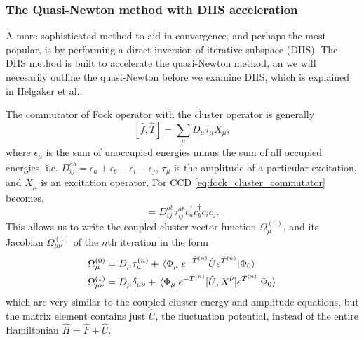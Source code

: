     


    \subsubsection{The Quasi-Newton method with DIIS acceleration}

    A more sophisticated method to aid in convergence, and perhaps the most popular,
    is by performing a direct inversion of iterative subspace (DIIS). The DIIS method 
    is built to accelerate the quasi-Newton method, an we will necesarily outline the 
    quasi-Newton before we examine DIIS, which is explained in Helgaker et 
    al.\cite{helgaker2014molecular}.

    The commutator of Fock operator with the cluster operator is generally
    \begin{equation}
        \label{eq:fock_cluster_commutator}
        [\hat{f}, \hat{T}] = \sum_\mu D_\mu \tau_\mu X_\mu,
    \end{equation}
    where $\epsilon_\mu$ is the sum of unoccupied energies minus the sum of all 
    occupied energies, i.e. $D^{ab}_{ij} = \epsilon_a  + \epsilon_b - \epsilon_i - \epsilon_j$,
    $\tau_\mu$ is the amplitude of a particular excitation, and $X_\mu$ is an excitation 
    operator. For CCD \autoref{eq:fock_cluster_commutator} becomes,
    \begin{equation}
        [\hat{f}, \hat{T}_2] = D^{ab}_{ij} \tau^{ab}_{ij} c^\dagger_a c^\dagger_b c_i c_j.
    \end{equation}
    This allows us to write the coupled cluster vector function $\Omega^{(0)}_\mu$,
    and its Jacobian $\Omega^{(1)}_{\mu\nu}$ of the $n$th iteration in the form 
    \begin{align}
        \label{eq:vector_function_diis}
        \Omega^{(0)}_\mu &= D_\mu \tau^{(n)}_\mu 
            + \mel{\Phi_\mu}
            {e^{-\hat{T}^{(n)}} \hat{U} e^{\hat{T}^{(n)}}}
            {\Phi_0} \\
        \label{eq:jacobian_diis}
        \Omega^{(1)}_{\mu\nu} &= D_\mu\delta_{\mu\nu} 
            + \mel{\Phi_\mu}
            {e^{-\hat{T}^{(n)}} [\hat{U}, X^\nu] e^{\hat{T}^{(n)}}}
            {\Phi_0}
    \end{align}
    which are very similar to the coupled cluster energy and amplitude equations, but 
    the matrix element contains just $\hat{U}$, the fluctuation potential, instead of 
    the entire Hamiltonian $\hat{H} = \hat{F} + \hat{U}$.

